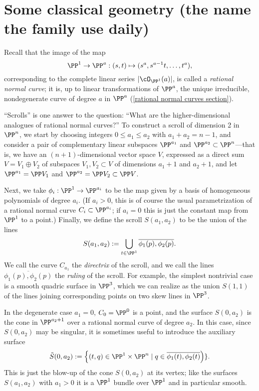 \section{Some classical geometry (the name the family use daily)}\label{daily name}

Recall that the image of the map 
$$
\PP^1\to\PP^a: (s,t) \mapsto (s^a, s^{a-1}t, \dots, t^a),
$$
corresponding to the complete linear series
$|\cO_{\PP^1}(a)|$, is called a \emph{rational normal curve}; it is, up to linear transformations of $\PP^a$, the unique irreducible, nondegenerate curve of degree $a$ in $\PP^a$ (\ref{rational normal curves section}).

``Scrolls'' is one answer to the question: ``What are the higher-dimensional analogues of rational normal curves?'' To construct a scroll of dimension 2 in $\PP^n$, we start by choosing integers $0\leq a_1 \leq a_2$ with $a_1 + a_2 = n-1$, and consider  a pair of complementary linear subspaces $\PP^{a_1}$ and $\PP^{a_2} \subset \PP^n$---that is, we have an $(n+1)$-dimensional vector space $V$, expressed as a direct sum $V = V_1 \oplus V_2$ of subspaces $V_1, V_2 \subset V$ of dimensions $a_1+1$ and $a_2+1$, and let $\PP^{a_1} = \PP V_1$ and $\PP^{a_2} = \PP V_2 \subset \PP V$.

Next, we take $\phi_i : \PP^1 \to \PP^{a_i}$ to be the map given by a basis of homogeneous polynomials of degree $a_i$. (If $a_i > 0$, this is of course the usual parametrization of a rational normal curve $C_i \subset \PP^{a_i}$; if $a_i = 0$ this is just the constant map from $\PP^1$ to a point.) Finally, we define the scroll $S(a_1, a_2)$ to be the union of the lines
$$
S(a_1,a_2) := \bigcup_{t\in \PP^1} \overline{\phi_1(p), \phi_2(p)}.
$$
We call the curve $C_{a_{1}}$ the \emph{directrix} of the scroll, and we call the lines $ \overline{\phi_1(p), \phi_2(p)}$ the \emph{ruling} of the scroll. For example, the simplest nontrivial case is a smooth quadric surface in $\PP^3$, which we can realize as the union $S(1,1)$ of the lines joining corresponding points on two skew lines in $\PP^3$. 

In the degenerate case $a_{1}= 0$, $C_{0}= \PP^{0}$ is a point, and the surface $S(0,a_{2})$ is the cone
in $\PP^{a_{2}+1}$ over a rational normal curve of degree $a_{2}$. In this case, since $S(0,a_2)$ may be singular, it is sometimes useful to introduce the auxiliary surface
$$
\tilde S(0, a_2) := \left\{ (t, q) \in \PP^1 \times \PP^n  \mid q \in \overline{\phi_1(t), \phi_2(t)}\right)\}.
$$
This is just the blow-up of the cone $S(0, a_2)$ at its vertex; like the surfaces $S(a_1,a_2)$ with $a_1 > 0$ it is a $\PP^1$ bundle over $\PP^1$ and in particular smooth.


